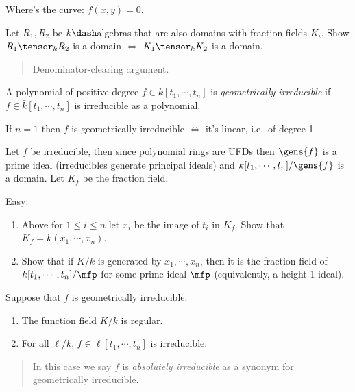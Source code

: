 Where's the curve: \(f(x, y) = 0\).

\begin{exercise}

Let \(R_1, R_2\) be \(k\dash\)algebras that are also domains with
fraction fields \(K_i\). Show \(R_1 \tensor_k R_2\) is a domain \(\iff\)
\(K_1 \tensor_k K_2\) is a domain.

\begin{quote}
Denominator-clearing argument.
\end{quote}

\end{exercise}

\begin{definition}

A polynomial of positive degree \(f\in k[t_1, \cdots, t_n]\) is
\emph{geometrically irreducible} if \(f\in \bar k[t_1, \cdots, t_n]\) is
irreducible as a polynomial.

\end{definition}

If \(n=1\) then \(f\) is geometrically irreducible \(\iff\) it's linear,
i.e.~of degree 1.

Let \(f\) be irreducible, then since polynomial rings are UFDs then
\(\gens{f}\) is a prime ideal (irreducibles generate principal ideals)
and \(k[t_1, \cdots, t_n]/\gens{f}\) is a domain. Let \(K_f\) be the
fraction field.

\begin{exercise}

Easy:

\begin{enumerate}
\def\labelenumi{\alph{enumi}.}
\item
  Above for \(1\leq i \leq n\) let \(x_i\) be the image of \(t_i\) in
  \(K_f\). Show that \(K_f = k(x_1, \cdots, x_n)\).
\item
  Show that if \(K/k\) is generated by \(x_1, \cdots, x_n\), then it is
  the fraction field of \(k[t_1, \cdots, t_n] /\mfp\) for some prime
  ideal \(\mfp\) (equivalently, a height 1 ideal).
\end{enumerate}

\end{exercise}

\begin{proposition}[?]

Suppose that \(f\) is geometrically irreducible.

\begin{enumerate}
\def\labelenumi{\alph{enumi}.}
\item
  The function field \(K/k\) is regular.
\item
  For all \(\ell/k\), \(f\in \ell[t_1, \cdots, t_n]\) is irreducible.
\end{enumerate}

\begin{quote}
In this case we say \(f\) is \emph{absolutely irreducible} as a synonym
for geometrically irreducible.
\end{quote}

\end{proposition}

